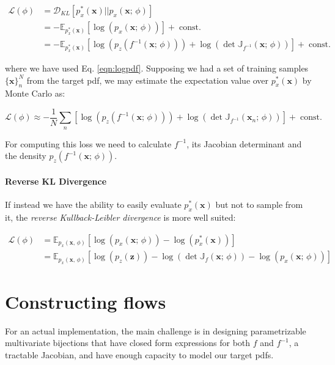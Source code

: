 \begin{equation}\label{eqn:kldiv}
    \begin{aligned}
    \mathcal{L}(\phi) &= \mathcal{D}_{KL}[p_x^*(\mathbf{x})||p_x(\mathbf{x}; \, \phi)]\\
    &= -\mathbb{E}_{p_x^*(\mathbf{x})}[\log(p_x(\mathbf{x}; \, \phi))] +\; \text{const.}\\
    &= -\mathbb{E}_{p_x^*(\mathbf{x})}[\log(p_z(f^{-1}(\mathbf{x}; \, \phi)))+\log\left(\det\mathbb{J}_{f^{-1}}(\mathbf{x}; \, \phi)\right)] +\; \text{const.}
    \end{aligned}
\end{equation}

where we have used Eq. \ref{eqn:logpdf}. Supposing we had a set of training samples $\{\mathbf{x}\}^N_n$ from the target pdf, we may estimate the expectation value over $p_x^*(\mathbf{x})$ by Monte Carlo as:

\[
\mathcal{L}(\phi) \approx -\frac{1}{N} \sum_n [\log(p_z(f^{-1}(\mathbf{x}; \, \phi)))+\log\left(\det\mathbb{J}_{f^{-1}}(\mathbf{x}_n; \, \phi)\right)] +\; \text{const.}
\]

For computing this loss we need to calculate $f^{-1}$, its Jacobian determinant and the density $p_z(f^{-1}(\mathbf{x}; \, \phi))$. 

\paragraph{Reverse KL Divergence} If instead we have the ability to easily evaluate $p_x^*(\mathbf{x})$ but not to sample from it, the \emph{reverse Kullback-Leibler divergence} is more well suited:

\[
\begin{aligned}
    \mathcal{L}(\phi) &= \mathbb{E}_{p_x(\mathbf{x}, \, \phi)}[\log(p_x(\mathbf{x}; \, \phi)) - \log(p_x^*(\mathbf{x}))]\\
    &= \mathbb{E}_{p_x(\mathbf{x}, \, \phi)}[\log(p_z(\mathbf{z}))-\log\left(\det\mathbb{J}_{f}(\mathbf{x}; \, \phi)\right)-\log(p_x(\mathbf{x}; \, \phi))]
\end{aligned}
\]

\section{Constructing flows}
For an actual implementation, the main challenge is in designing parametrizable multivariate bijections that have closed form expressions for both $f$ and $f^{-1}$, a tractable Jacobian, and have enough capacity to model our target pdfs.

